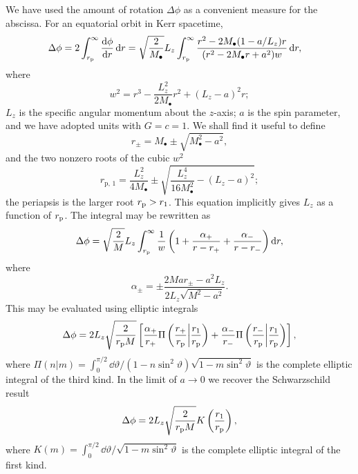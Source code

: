 We have used the amount of rotation $\Delta\phi$ as a convenient measure for the abscissa. For an equatorial orbit in Kerr spacetime,
\begin{align}
\Delta\phi  = {} & 2\int_{r_\mathrm{p}}^{\infty}{\dfrac{\mathrm{d} {\phi}}{\mathrm{d} {r}}}\,\mathrm{d}{r} = \sqrt{\dfrac{2}{M_\bullet}}L_z\int_{r_\mathrm{p}}^{\infty}{\dfrac{r^2 - 2M_\bullet(1 - a/L_z)r}{(r^2 - 2M_\bullet r + a^2)w}}\,\mathrm{d}{r},
\end{align}
where
\begin{equation}
w^2 = r^3 - \dfrac{L_z^2}{2M_\bullet}r^2 + (L_z - a)^2r;
\end{equation}
$L_z$ is the specific angular momentum about the $z$-axis; $a$ is the spin parameter, and we have adopted units with $G = c = 1$. We shall find it useful to define
\begin{equation}
r_\pm = M_\bullet \pm \sqrt{M_\bullet^2 - a^2},
\end{equation}
and the two nonzero roots of the cubic $w^2$
\begin{equation}
r_{\mathrm{p},\,1} = \dfrac{L_z^2}{4M_\bullet} \pm \sqrt{\dfrac{L_z^4}{16M_\bullet^2} - (L_z -a)^2};
\end{equation}
the periapsis is the larger root $r_\mathrm{p} > r_1$. This equation implicitly gives $L_z$ as a function of $r_\mathrm{p}$. The integral may be rewritten as
\begin{equation}
\Delta\phi = \sqrt{\dfrac{2}{M}}L_z\int_{r_\mathrm{p}}^{\infty}{\dfrac{1}{w}\left(1 + \dfrac{\alpha_+}{r-r_+} + \dfrac{\alpha_-}{r-r_-}\right)}\,\mathrm{d}{r},
\end{equation}
where
\begin{equation}
\alpha_\pm = \pm\dfrac{2Mar_\pm - a^2L_z}{2L_z\sqrt{M^2-a^2}}.
\end{equation}
This may be evaluated using elliptic integrals \citep[3.131.8, 3.137.8]{Gradshteyn2000}
\begin{equation}
\Delta\phi = 2 L_z \sqrt{\dfrac{2}{r_\mathrm{p}M}}\left[\dfrac{\alpha_+}{r_+}\Pi\left(\dfrac{r_+}{r_\mathrm{p}}\middle|\dfrac{r_1}{r_\mathrm{p}}\right) + \dfrac{\alpha_-}{r_-}\Pi\left(\dfrac{r_-}{r_\mathrm{p}}\middle|\dfrac{r_1}{r_\mathrm{p}}\right)\right],
\end{equation}
where $\Pi(n|m) = \int_{0}^{\pi/2}{\dd\vartheta/(1-n\sin^2\vartheta)\sqrt{1-m\sin^2\vartheta}}$ is the complete elliptic integral of the third kind. In the limit of $a \rightarrow 0$ we recover the Schwarzschild result \citep{Cutler1994}
\begin{equation}
\Delta\phi =  2 L_z\sqrt{\dfrac{2}{r_\mathrm{p}M}}K\left(\dfrac{r_1}{r_\mathrm{p}}\right),
\end{equation}
where $K(m) = \int_{0}^{\pi/2}{\dd\vartheta/\sqrt{1-m\sin^2\vartheta}}$ is the complete elliptic integral of the first kind.

